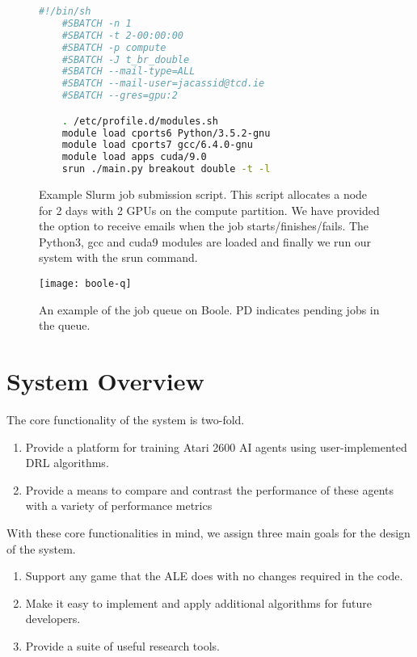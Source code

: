 \begin{figure}[H]
    \centering
    \begin{lstlisting}[language=bash]
    #!/bin/sh
    #SBATCH -n 1
    #SBATCH -t 2-00:00:00
    #SBATCH -p compute
    #SBATCH -J t_br_double
    #SBATCH --mail-type=ALL
    #SBATCH --mail-user=jacassid@tcd.ie
    #SBATCH --gres=gpu:2

    . /etc/profile.d/modules.sh
    module load cports6 Python/3.5.2-gnu
    module load cports7 gcc/6.4.0-gnu
    module load apps cuda/9.0
    srun ./main.py breakout double -t -l
    \end{lstlisting}
    \caption{Example Slurm job submission script. This script allocates a node for 2 days with 2 GPUs on the compute partition. We have provided the option to receive emails when the job starts/finishes/fails. The Python3, gcc and cuda9 modules are loaded and finally we run our system with the srun command.}
\end{figure}

\begin{figure}[h]
    \centering
    \texttt{[image: boole-q]}
    \caption{An example of the job queue on Boole. PD indicates pending jobs in the queue.}
    \label{fig:boolq}
\end{figure}

\section{System Overview}
The core functionality of the system is two-fold.
\begin{enumerate}
    \item Provide a platform for training Atari 2600 AI agents using user-implemented DRL algorithms.
    \item Provide a means to compare and contrast the performance of these agents with a variety of performance metrics
\end{enumerate}

With these core functionalities in mind, we assign three main goals for the design of the system.
\begin{enumerate}
    \item Support any game that the ALE does with no changes required in the code.
    \item Make it easy to implement and apply additional algorithms for future developers.
    \item Provide a suite of useful research tools.
\end{enumerate}
